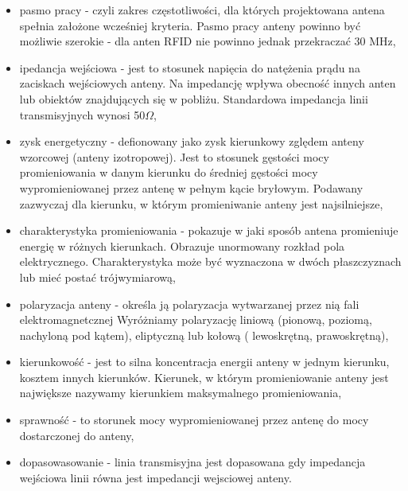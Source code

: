 \begin{itemize}\setlength{\itemsep}{0pt}

	\item pasmo pracy - czyli zakres częstotliwości, dla których projektowana antena spełnia założone wcześniej kryteria. Pasmo pracy anteny powinno być możliwie szerokie - dla anten RFID nie powinno jednak przekraczać 30 MHz,

	\item ipedancja wejściowa - jest to stosunek napięcia do natężenia prądu na zaciskach wejściowych anteny. Na impedancję wpływa obecność innych anten lub obiektów znajdujących się w pobliżu.
	Standardowa impedancja linii transmisyjnych wynosi 50\(\Omega\),

	\item zysk energetyczny - defionowany jako zysk kierunkowy zględem anteny wzorcowej (anteny izotropowej).
	Jest to stosunek gęstości mocy promieniowania w danym kierunku do średniej gęstości mocy wypromieniowanej przez antenę w pełnym kącie bryłowym. Podawany zazwyczaj dla kierunku, w którym promieniwanie anteny jest najsilniejsze, 

	\item charakterystyka promieniowania - pokazuje w jaki sposób antena promieniuje energię w różnych kierunkach. Obrazuje unormowany rozkład pola elektrycznego. Charakterystyka może być wyznaczona w dwóch płaszczyznach lub mieć postać trójwymiarową,

	\item polaryzacja anteny - określa ją polaryzacja wytwarzanej przez nią fali elektromagnetcznej 
	Wyróżniamy polaryzację liniową (pionową, poziomą, nachyloną pod kątem), eliptyczną lub kołową ( lewoskrętną, prawoskrętną),

	\item kierunkowość - jest to silna koncentracja energii anteny w jednym kierunku, kosztem innych kierunków. Kierunek, w którym promieniowanie anteny jest największe nazywamy kierunkiem maksymalnego promieniowania,

	\item sprawność - to storunek mocy wypromieniowanej przez antenę do mocy dostarczonej do anteny,

	\item dopasowasowanie - linia transmisyjna jest dopasowana gdy impedancja wejściowa linii równa jest impedancji wejsciowej anteny. 

\end{itemize}


